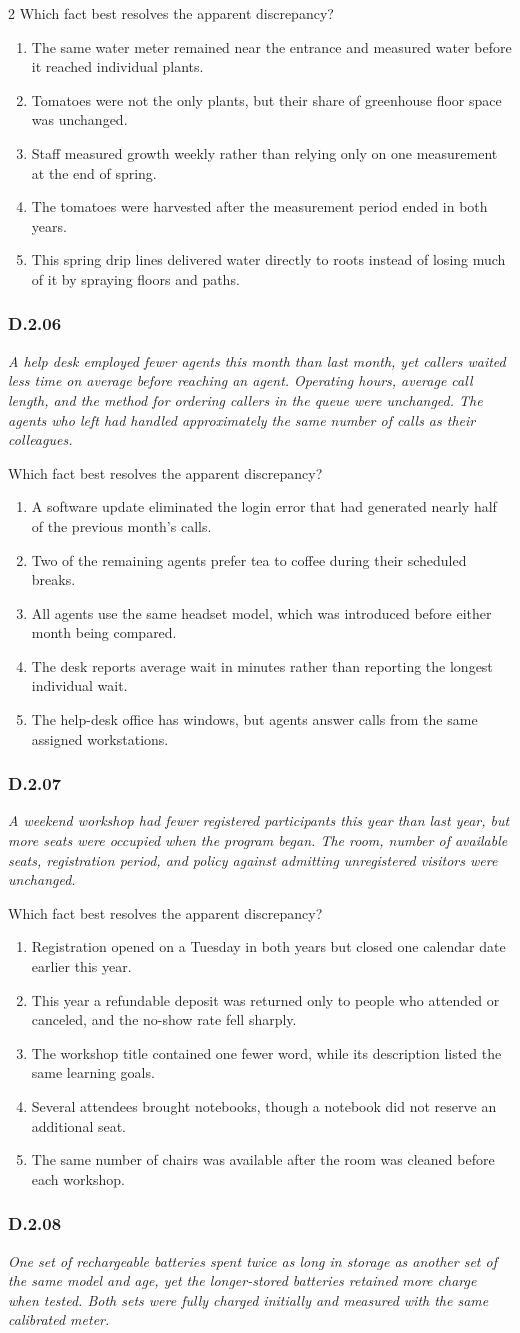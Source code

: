 \documentclass[10pt]{extarticle}
\newcommand{\choice}[1]{\item #1}
\newcommand{\bankitem}[1]{\subsubsection*{#1}}
\begin{document}
\begin{multicols}{2}
Which fact best resolves the apparent discrepancy?
\begin{enumerate}[label=(\alph*)]
  \choice{The same water meter remained near the entrance and measured water before it reached individual plants.}
  \choice{Tomatoes were not the only plants, but their share of greenhouse floor space was unchanged.}
  \choice{Staff measured growth weekly rather than relying only on one measurement at the end of spring.}
  \choice{The tomatoes were harvested after the measurement period ended in both years.}
  \choice{This spring drip lines delivered water directly to roots instead of losing much of it by spraying floors and paths.}
\end{enumerate}
\bankitem{D.2.06}
\emph{A help desk employed fewer agents this month than last month, yet callers waited less time on average before reaching an agent. Operating hours, average call length, and the method for ordering callers in the queue were unchanged. The agents who left had handled approximately the same number of calls as their colleagues.}

Which fact best resolves the apparent discrepancy?
\begin{enumerate}[label=(\alph*)]
  \choice{A software update eliminated the login error that had generated nearly half of the previous month's calls.}
  \choice{Two of the remaining agents prefer tea to coffee during their scheduled breaks.}
  \choice{All agents use the same headset model, which was introduced before either month being compared.}
  \choice{The desk reports average wait in minutes rather than reporting the longest individual wait.}
  \choice{The help-desk office has windows, but agents answer calls from the same assigned workstations.}
\end{enumerate}
\bankitem{D.2.07}
\emph{A weekend workshop had fewer registered participants this year than last year, but more seats were occupied when the program began. The room, number of available seats, registration period, and policy against admitting unregistered visitors were unchanged.}

Which fact best resolves the apparent discrepancy?
\begin{enumerate}[label=(\alph*)]
  \choice{Registration opened on a Tuesday in both years but closed one calendar date earlier this year.}
  \choice{This year a refundable deposit was returned only to people who attended or canceled, and the no-show rate fell sharply.}
  \choice{The workshop title contained one fewer word, while its description listed the same learning goals.}
  \choice{Several attendees brought notebooks, though a notebook did not reserve an additional seat.}
  \choice{The same number of chairs was available after the room was cleaned before each workshop.}
\end{enumerate}
\bankitem{D.2.08}
\emph{One set of rechargeable batteries spent twice as long in storage as another set of the same model and age, yet the longer-stored batteries retained more charge when tested. Both sets were fully charged initially and measured with the same calibrated meter.}


\end{multicols}
\end{document}
